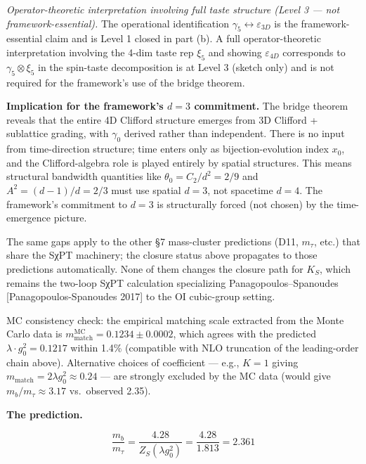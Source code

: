 \documentclass[
]{article}
\begin{document}
\emph{Operator-theoretic interpretation involving full taste structure
(Level 3 --- not framework-essential).} The operational identification
\(\gamma_5 \leftrightarrow \varepsilon_{3D}\) is the framework-essential
claim and is Level 1 closed in part (b). A full operator-theoretic
interpretation involving the 4-dim taste rep \(\xi_5\) and showing
\(\varepsilon_{4D}\) corresponds to \(\gamma_5 \otimes \xi_5\) in the
spin-taste decomposition is at Level 3 (sketch only) and is not required
for the framework's use of the bridge theorem.

\textbf{Implication for the framework's \(d = 3\) commitment.} The
bridge theorem reveals that the entire 4D Clifford structure emerges
from 3D Clifford + sublattice grading, with \(\gamma_0\) derived rather
than independent. There is no input from time-direction structure; time
enters only as bijection-evolution index \(x_0\), and the
Clifford-algebra role is played entirely by spatial structures. This
means structural bandwidth quantities like \(\theta_0 = C_2/d^2 = 2/9\)
and \(A^2 = (d-1)/d = 2/3\) must use spatial \(d = 3\), not spacetime
\(d = 4\). The framework's commitment to \(d = 3\) is structurally
forced (not chosen) by the time-emergence picture.

The same gaps apply to the other §7 mass-cluster predictions (D11,
\(m_\tau\), etc.) that share the SχPT machinery; the closure status
above propagates to those predictions automatically. None of them
changes the closure path for \(K_S\), which remains the two-loop SχPT
calculation specializing Panagopoulos--Spanoudes
{[}Panagopoulos-Spanoudes 2017{]} to the OI cubic-group setting.

MC consistency check: the empirical matching scale extracted from the
Monte Carlo data is
\(m_{\text{match}}^{\text{MC}} = 0.1234 \pm 0.0002\), which agrees with
the predicted \(\lambda \cdot g_0^2 = 0.1217\) within 1.4\% (compatible
with NLO truncation of the leading-order chain above). Alternative
choices of coefficient --- e.g., \(K = 1\) giving
\(m_{\text{match}} = 2\lambda g_0^2 \approx 0.24\) --- are strongly
excluded by the MC data (would give \(m_b/m_\tau \approx 3.17\)
vs.~observed 2.35).

\textbf{The prediction.}

\[\boxed{\frac{m_b}{m_\tau} = \frac{4.28}{Z_S(\lambda g_0^2)} = \frac{4.28}{1.813} = 2.361}\]
\end{document}
